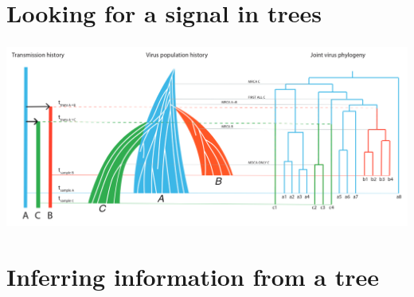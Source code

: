 \documentclass[aspectratio=169]{beamer}
\begin{document}
\section{Looking for a signal in trees} %

\begin{frame} \frametitle{\insertsection}
    \begin{center}
        \centering\includegraphics[width=\textwidth]{images/thomas-figure}
    \end{center}
\end{frame}

\section{Inferring information from a tree}
\end{document}
